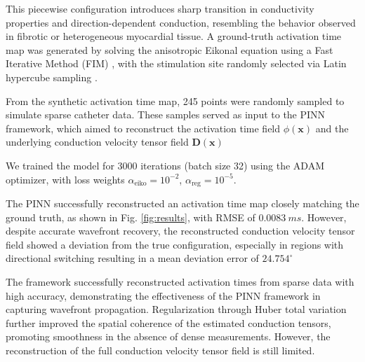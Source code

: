 This piecewise configuration introduces sharp transition in conductivity properties and direction-dependent conduction, resembling the behavior observed in fibrotic or heterogeneous myocardial tissue. A ground-truth activation time map was generated by solving the anisotropic Eikonal equation using a Fast Iterative Method (FIM) \cite{Grandits2021}, with the stimulation site randomly selected via Latin hypercube sampling \cite{Stein1987}.

From the synthetic activation time map, 245 points were randomly sampled to simulate sparse catheter data. These samples served as input to the PINN framework, which aimed to reconstruct the activation time field $\phi(\mathbf{x})$ and the underlying conduction velocity tensor field $\mathbf{D}(\mathbf{x})$

We trained the model for 3000 iterations (batch size 32) using the ADAM optimizer, with loss weights $\alpha_{\text{eiko}} = 10^{-2}$, $\alpha_{\text{reg}} = 10^{-5}$.

The PINN successfully reconstructed an activation time map closely matching the ground truth, as shown in Fig. \ref{fig:results}, with RMSE of $0.0083 \ ms$. However, despite accurate wavefront recovery, the reconstructed conduction velocity tensor field showed a deviation from the true configuration, especially in regions with directional switching resulting in a mean deviation error of $24.754^\circ$

The framework successfully reconstructed activation times from sparse data with high accuracy, demonstrating the effectiveness of the PINN framework in capturing wavefront propagation. Regularization through Huber total variation further improved the spatial coherence of the estimated conduction tensors, promoting smoothness in the absence of dense measurements. However, the reconstruction of the full conduction velocity tensor field is still limited.